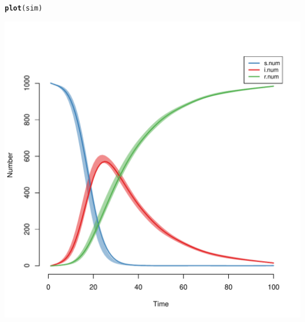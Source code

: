 \documentclass{article}\usepackage[]{graphicx}\usepackage[]{color}
\makeatletter
\def\maxwidth{ %
  \ifdim\Gin@nat@width>\linewidth
    \linewidth
  \else
    \Gin@nat@width
  \fi
}
\newcommand{\hlstd}[1]{\textcolor[rgb]{0.345,0.345,0.345}{#1}}%
\newcommand{\hlkwd}[1]{\textcolor[rgb]{0.737,0.353,0.396}{\textbf{#1}}}%
\newenvironment{kframe}{%
 \def\at@end@of@kframe{}%
 \ifinner\ifhmode%
  \def\at@end@of@kframe{\end{minipage}}%
  \begin{minipage}{\columnwidth}%
 \fi\fi%
 \def\FrameCommand##1{\hskip\@totalleftmargin \hskip-\fboxsep
 \colorbox{shadecolor}{##1}\hskip-\fboxsep
     \hskip-\linewidth \hskip-\@totalleftmargin \hskip\columnwidth}%
 \MakeFramed {\advance\hsize-\width
   \@totalleftmargin\z@ \linewidth\hsize
   \@setminipage}}%
 {\par\unskip\endMakeFramed%
 \at@end@of@kframe}
\newenvironment{knitrout}{}{} %
\makeatother
\begin{document}
\begin{knitrout}
\color{fgcolor}\begin{kframe}
\begin{alltt}
\hlkwd{plot}\hlstd{(sim)}
\end{alltt}
\end{kframe}
\includegraphics[width=\maxwidth]{figure/unnamed-chunk-12-1} 

\end{knitrout}
\end{document}

